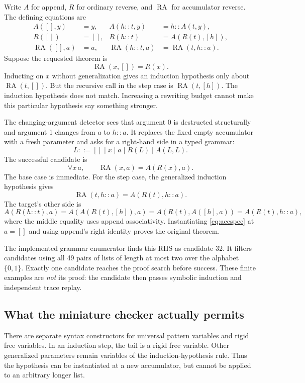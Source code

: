 Write $A$ for append, $R$ for ordinary reverse, and $\operatorname{RA}$ for
accumulator reverse. The defining equations are
\begin{align*}
A([],y)&=y,& A(h::t,y)&=h::A(t,y),\\
R([])&=[],&R(h::t)&=A(R(t),[h]),\\
\operatorname{RA}([],a)&=a,&
\operatorname{RA}(h::t,a)&=\operatorname{RA}(t,h::a).
\end{align*}
Suppose the requested theorem is
\[
\operatorname{RA}(x,[])=R(x).
\]
Inducting on $x$ without generalization gives an induction hypothesis only
about $\operatorname{RA}(t,[])$. But the recursive call in the step case is
$\operatorname{RA}(t,[h])$. The induction hypothesis does not match.
Increasing a rewriting budget cannot make this particular hypothesis say
something stronger.

The changing-argument detector sees that argument 0 is destructed structurally
and argument 1 changes from $a$ to $h::a$. It replaces the fixed empty
accumulator with a fresh parameter and asks for a right-hand side in a typed
grammar:
\[
L ::= []\mid x\mid a\mid R(L)\mid A(L,L).
\]
The successful candidate is
\begin{equation}\label{eq:accspec}
\forall x\,a,\qquad \operatorname{RA}(x,a)=A(R(x),a).
\end{equation}
The base case is immediate. For the step case, the generalized induction
hypothesis gives
\[
\operatorname{RA}(t,h::a)=A(R(t),h::a).
\]
The target's other side is
\[
A(R(h::t),a)=A(A(R(t),[h]),a)
          =A(R(t),A([h],a))=A(R(t),h::a),
\]
where the middle equality uses append associativity. Instantiating
\eqref{eq:accspec} at $a=[]$ and using append's right identity proves the
original theorem.

The implemented grammar enumerator finds this RHS as candidate 32. It filters
candidates using all 49 pairs of lists of length at most two over the alphabet
$\{0,1\}$. Exactly one candidate reaches the proof search before success.
These finite examples are \emph{not} its proof: the candidate then passes
symbolic induction and independent trace replay.

\subsection{What the miniature checker actually permits}

There are separate syntax constructors for universal pattern variables and
rigid free variables. In an induction step, the tail is a rigid free variable.
Other generalized parameters remain variables of the induction-hypothesis
rule. Thus the hypothesis can be instantiated at a new accumulator, but cannot
be applied to an arbitrary longer list.

